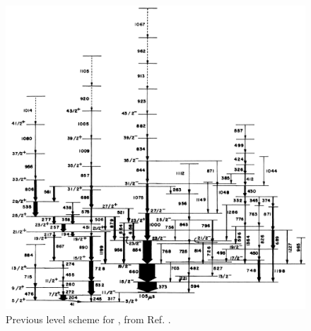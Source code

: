 \begin{figure}[ht!]
\centerline{\includegraphics[width=\textwidth]{./img/c4/old_scheme.png}}
	\caption{Previous level scheme for \pr{}, from Ref. \cite{semkow135Pr}. \label{fig:chp4-semkow-lvl-schm}}
\end{figure}

